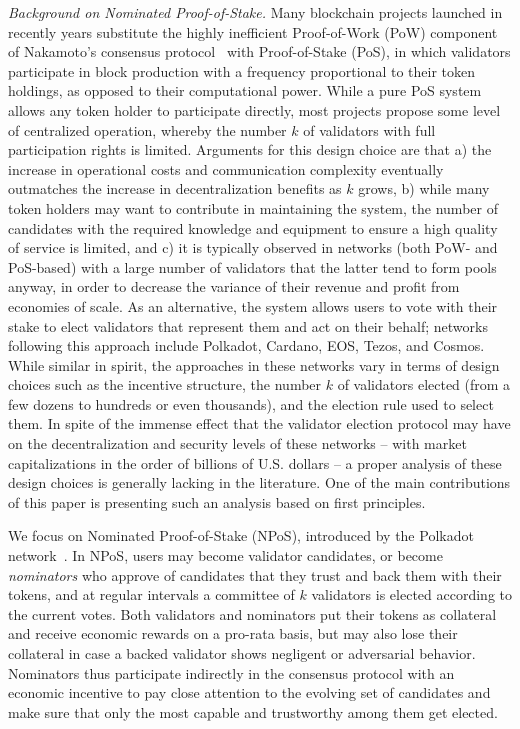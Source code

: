 \emph{Background on Nominated Proof-of-Stake.}
Many blockchain projects launched in recently years substitute the highly inefficient Proof-of-Work (PoW) component of Nakamoto's consensus protocol~\cite{nakamoto2019bitcoin} with Proof-of-Stake (PoS), in which validators participate in block production with a frequency proportional to their token holdings, as opposed to their computational power. 
While a pure PoS system allows any token holder to participate directly, most projects propose some level of centralized operation, whereby the number $k$ of validators with full participation rights is limited. 
Arguments for this design choice are that a) the increase in operational costs and communication complexity eventually outmatches the increase in decentralization benefits as $k$ grows, b) while many token holders may want to contribute in maintaining the system, the number of candidates with the required knowledge and equipment to ensure a high quality of service is limited, and c) it is typically observed in networks (both PoW- and PoS-based) with a large number of validators that the latter tend to form pools anyway, in order to decrease the variance of their revenue and profit from economies of scale. 
As an alternative, the system allows users to vote with their stake to elect validators that represent them and act on their behalf; networks following this approach include Polkadot, Cardano, EOS, Tezos, and Cosmos. 
%
While similar in spirit, the approaches in these networks vary in terms of design choices such as the incentive structure, the number $k$ of validators elected (from a few dozens to hundreds or even thousands), and the election rule used to select them. 
In spite of the immense effect that the validator election protocol may have on the decentralization and security levels of these networks -- with market capitalizations in the order of billions of U.S. dollars -- a proper analysis of these design choices is generally lacking in the literature. 
One of the main contributions of this paper is presenting such an analysis based on first principles.

We focus on Nominated Proof-of-Stake (NPoS), introduced by the Polkadot network~\cite{burdges2020overview}. In NPoS, users may become validator candidates, or become \emph{nominators} who approve of candidates that they trust and back them with their tokens, and at regular intervals a committee of $k$ validators is elected according to the current votes. 
Both validators and nominators put their tokens as collateral and receive economic rewards on a pro-rata basis, but may also lose their collateral in case a backed validator shows negligent or adversarial behavior. 
Nominators thus participate indirectly in the consensus protocol with an economic incentive to pay close attention to the evolving set of candidates and make sure that only the most capable and trustworthy among them get elected. 

